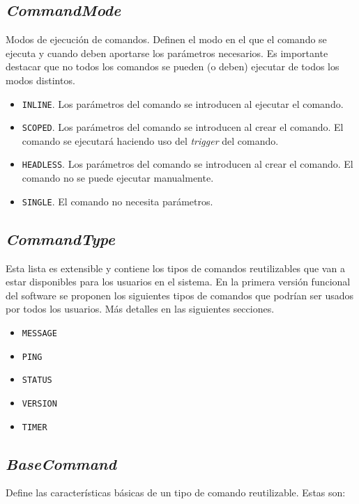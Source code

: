 \subsection{\textit{CommandMode}}

Modos de ejecución de comandos. Definen el modo en el que el comando se ejecuta y cuando deben aportarse los parámetros necesarios. Es importante destacar que no todos los comandos se pueden (o deben) ejecutar de todos los modos distintos.

\begin{itemize}
	\item \verb|INLINE|. Los parámetros del comando se introducen al ejecutar el comando.
	\item \verb|SCOPED|. Los parámetros del comando se introducen al crear el comando. El comando se ejecutará haciendo uso del \textit{trigger} del comando.
	\item \verb|HEADLESS|. Los parámetros del comando se introducen al crear el comando. El comando no se puede ejecutar manualmente.
	\item \verb|SINGLE|. El comando no necesita parámetros.
\end{itemize}

\subsection{\textit{CommandType}}
\label{sec:commandtype}

Esta lista es extensible y contiene los tipos de comandos reutilizables que van a estar disponibles para los usuarios en el sistema. En la primera versión funcional del software se proponen los siguientes tipos de comandos que podrían ser usados por todos los usuarios. Más detalles en las siguientes secciones.

\begin{itemize}
	\item \verb|MESSAGE|
	\item \verb|PING|
	\item \verb|STATUS|
	\item \verb|VERSION|
	\item \verb|TIMER|
\end{itemize}

\subsection{\textit{BaseCommand}}

Define las características básicas de un tipo de comando reutilizable. Estas son:

